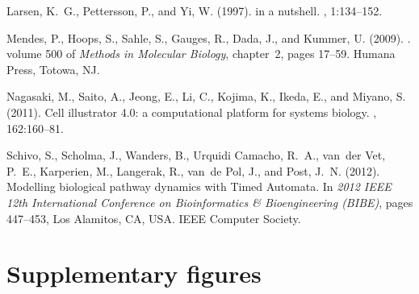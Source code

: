 \begin{thebibliography}{}
Larsen, K.~G., Pettersson, P., and Yi, W. (1997).
 in a nutshell.
, 1:134--152.

Mendes, P., Hoops, S., Sahle, S., Gauges, R., Dada, J., and Kummer, U. (2009).
.
\newblock volume 500 of {\em Methods in Molecular Biology}, chapter~2, pages
  17--59. Humana Press, Totowa, NJ.

Nagasaki, M., Saito, A., Jeong, E., Li, C., Kojima, K., Ikeda, E., and Miyano,
  S. (2011).
\newblock Cell illustrator 4.0: a computational platform for systems biology.
, 162:160--81.

Schivo, S., Scholma, J., Wanders, B., {Urquidi Camacho}, R.~A., van~der Vet,
  P.~E., Karperien, M., Langerak, R., van~de Pol, J., and Post, J.~N. (2012).
\newblock Modelling biological pathway dynamics with {Timed Automata}.
\newblock In {\em 2012 IEEE 12th International Conference on Bioinformatics \&
  Bioengineering (BIBE)}, pages 447--453, Los Alamitos, CA, USA. IEEE Computer
  Society.

\end{thebibliography}





\clearpage

\section*{Supplementary figures}\label{sec:supplementary-figures}


